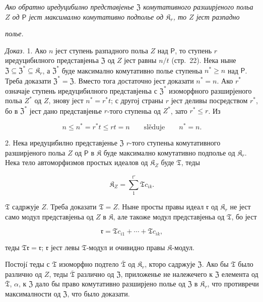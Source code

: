 \documentclass[11pt]{article}
\begin{document}
\emph{Ако обратно иредуцибилно представјенье \(\mathfrak Z\) комутативного разширјеного польа \(Z\) од \(\mathsf P\) јест максимално комутативно подполье од \(\mathfrak K_r\), то \(Z\) јест разпадно}

\emph{полье.}

\emph{Доказ.} 1. Ако \(n\) јест ступень разпадного польа \(Z\) над \(\mathsf P\), то ступень \(r\) иредуцибилного представјеньа \(\mathfrak Z\) од \(Z\) јест равны \(n/t\) (стр.~22). Нека ныне \(\mathfrak Z\subseteq\mathfrak Z^*\subseteq\mathfrak K_r\), а \(\mathfrak Z^*\) буде максимално комутативно полье ступеньа \(n^*\geq n\) над \(\mathsf P\). Треба доказати \(\mathfrak Z^*=\mathfrak Z\). Вместо тога достаточно јест доказати \(n^*=n\). Ако \(r^*\) означаје ступень иредуцибилного представјеньа с \(\mathfrak Z^*\) изоморфного разширјеного польа \(Z^*\) од \(Z\), знову јест \(n^*=r^*t\); с другој страны \(r\) јест деливы посредством \(r^*\), бо в \(\mathfrak Z^*\) јест дано представјенье \(r\)-того ступеньа од \(Z^*\), зато \(r^*\leq r\). Из

\[
n\leq n^*=r^*t\leq rt=n \qquad\text{slěduje}\qquad n^*=n.
\]

2. Нека иредуцибилно представјенье \(\mathfrak Z\) \(r\)-того ступеньа комутативного разширјеного польа \(Z\) од \(\mathsf P\) в \(\mathfrak K\) буде максимално комутативно подполье од \(\mathfrak K_r\). Нека тело автоморфизмов простых идеалов од \(\mathfrak K_Z\) буде \(\mathfrak T\), теды

\[
\mathfrak K_Z=\sum_{1}^{t'}\mathfrak T c_{ik}.
\]

\(\mathfrak T\) садржује \(Z\). Треба доказати \(\mathfrak T=Z\). Ныне просты правы идеал \(\mathfrak r\) од \(\mathfrak K_r\) не јест само модул представјеньа од \(Z\) в \(\mathfrak K\), але такоже модул представјеньа од \(\mathfrak T\), бо јест

\[
\mathfrak r=\mathfrak T c_{i1}+\cdots+\mathfrak T c_{ik},
\]

теды \(\mathfrak T\mathfrak r=\mathfrak r\); \(\mathfrak r\) јест левы \(\mathfrak T\)-модул и очивидно правы \(\mathfrak K\)-модул.

Постојí теды с \(\mathfrak T\) изоморфно подтело \(\overline{\mathfrak T}\) од \(\mathfrak K_r\), кторо садржује \(\mathfrak Z\). Ако бы \(\mathfrak T\) было различно од \(Z\), теды \(\overline{\mathfrak T}\) различно од \(\mathfrak Z\), приложенье не належечего к \(\mathfrak Z\) елемента од \(\overline{\mathfrak T}\), \(\alpha\), к \(\mathfrak Z\) дало бы право комутативно разширјено полье од \(\mathfrak Z\) в \(\mathfrak K_r\), что противречи максималности од \(\mathfrak Z\), что было доказати.
\end{document}
